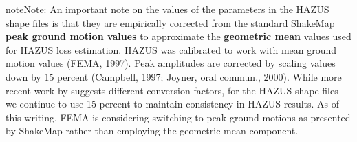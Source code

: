 \documentclass[letterpaper,10pt,english]{sphinxmanual}
\begin{document}
\begin{notice}{note}{Note:}
An important note on the values of the parameters in the HAZUS shape files is that they are empirically corrected from the standard ShakeMap \textbf{peak ground motion values} to approximate the \textbf{geometric mean} values used for HAZUS loss estimation.  HAZUS was calibrated to work with mean ground motion values (FEMA, 1997). Peak amplitudes are corrected by scaling values down by 15 percent (Campbell, 1997; Joyner, oral commun., 2000). While more recent work by {\hyperref[references:beyer2006]{}} suggests different conversion factors, for the HAZUS shape files we continue to use 15 percent to maintain consistency in HAZUS results. As of this writing, FEMA is considering switching to peak ground motions as presented by ShakeMap rather than employing the geometric mean component.
\end{notice}
\end{document}

